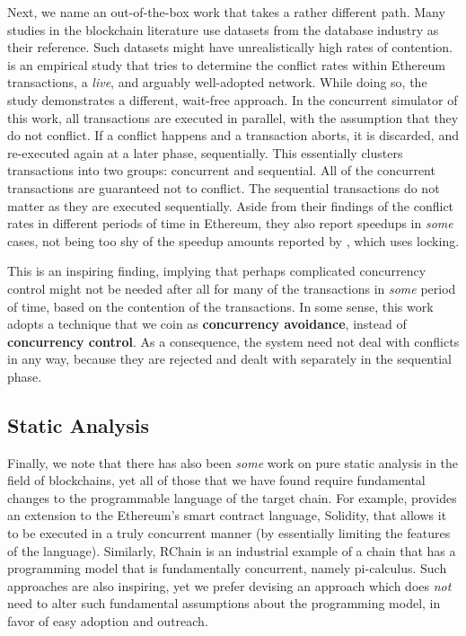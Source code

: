 Next, we name an out-of-the-box work that takes a rather different path. Many studies in the
blockchain literature use datasets from the database industry as their reference. Such datasets
might have unrealistically high rates of contention. \cite{saraphEmpiricalStudySpeculative2019} is
an empirical study that tries to determine the conflict rates within Ethereum transactions, a
\textit{live}, and arguably well-adopted network. While doing so, the study demonstrates a
different, wait-free approach. In the concurrent simulator of this work, all transactions are
executed in parallel, with the assumption that they do not conflict. If a conflict happens and a
transaction aborts, it is discarded, and re-executed again at a later phase, sequentially. This
essentially clusters transactions into two groups: concurrent and sequential. All of the concurrent
transactions are guaranteed not to conflict. The sequential transactions do not matter as they are
executed sequentially. Aside from their findings of the conflict rates in different periods of time
in Ethereum, they also report speedups in \textit{some} cases, not being too shy of the speedup
amounts reported by \cite{dickersonSmartLocksAddingConcurrency2017}, which uses locking.

This is an inspiring finding, implying that perhaps complicated concurrency control might not be
needed after all for many of the transactions in \textit{some} period of time, based on the
contention of the transactions. In some sense, this work adopts a technique that we coin as
\textbf{concurrency avoidance}, instead of \textbf{concurrency control}. As a consequence, the
system need not deal with conflicts in any way, because they are rejected and dealt with separately
in the sequential phase.

\subsection*{Static Analysis}

Finally, we note that there has also been \textit{some} work on pure static analysis in the field of
blockchains, yet all of those that we have found require fundamental changes to the programmable
language of the target chain. For example, \cite{bartolettiTrueConcurrentModel2019} provides an
extension to the Ethereum's smart contract language, Solidity, that allows it to be executed in a
truly concurrent manner (by essentially limiting the features of the language). Similarly, RChain is
an industrial example of a chain that has a programming model that is fundamentally
concurrent\cite{darrylRCast21Currency2019}, namely
pi-calculus\cite{turnerPolymorphicPiCalculusTheory1996}. Such approaches are also inspiring, yet we
prefer devising an approach which does \textit{not} need to alter such fundamental assumptions about
the programming model, in favor of easy adoption and outreach.

